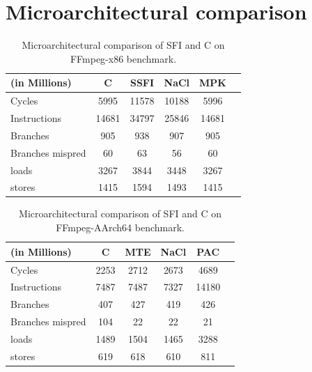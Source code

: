 \section{Microarchitectural comparison}

\begin{table}[!htbp]
    \begin{small}
    \begin{center}
  \begin{tabular}{| l | c | c | c | c | c |}
  \hline
  (in Millions)    & C   & SSFI   & NaCl & MPK   \\
  \hline
  \hline
  Cycles           & 5995 & 11578  & 10188 & 5996  \\
  Instructions     & 14681  & 34797  & 25846 & 14681 \\
  Branches         & 905   & 938   & 907  & 905   \\
  Branches mispred & 60   & 63    & 56   & 60    \\
  loads            & 3267  & 3844  & 3448 & 3267  \\
  stores           & 1415  & 1594   & 1493  & 1415   \\
  \hline
  \end{tabular}
  \end{center}
\end{small}
  \caption{Microarchitectural comparison of SFI and C on FFmpeg-x86 benchmark.}
  \label{table:micro-ffmpeg-x86}
  \end{table}


\begin{table}[!htbp]
    \begin{small}
    \begin{center}
  \begin{tabular}{| l | c | c | c | c | c |}
  \hline
  (in Millions)    & C   & MTE   & NaCl & PAC   \\
  \hline
  \hline
  Cycles           & 2253 & 2712  & 2673 & 4689  \\
  Instructions     & 7487  & 7487  & 7327 & 14180 \\
  Branches         & 407   & 427   & 419  & 426   \\
  Branches mispred & 104   & 22    & 22   & 21    \\
  loads            & 1489  & 1504  & 1465 & 3288  \\
  stores           & 619  & 618   & 610  & 811   \\
  \hline
  \end{tabular}
  \end{center}
\end{small}
  \caption{Microarchitectural comparison of SFI and C on FFmpeg-AArch64 benchmark.}
  \label{table:micro-ffmpeg-arm}
  \end{table}
